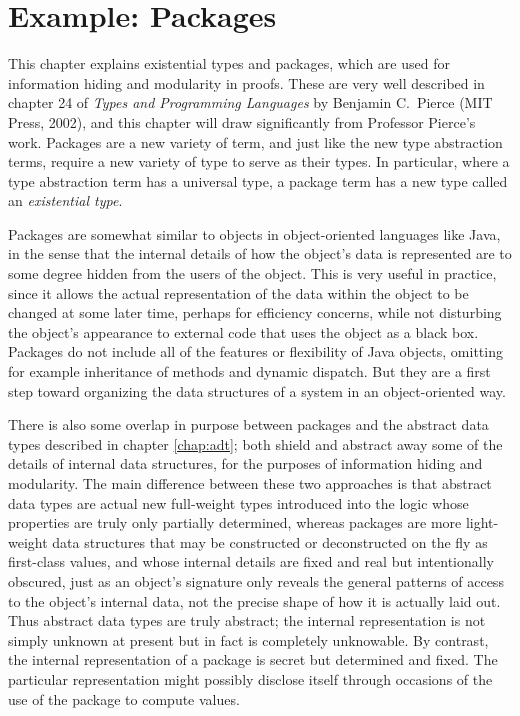 
\chapter{Example: Packages}\label{chap:package}

This chapter explains existential types and 
packages, which are used for information hiding and modularity in proofs. 
These are very well described in chapter 24 of {\it Types and Programming Languages\/} 
by Benjamin C.~Pierce (MIT Press, 2002), 
and this chapter will draw significantly from Professor Pierce's work.
Packages are a new variety of term, and
just like the new type abstraction terms, require a new
variety of type to serve as their types. In particular, 
where a type abstraction term has a universal type, 
a package term has a new type called an {\it existential type}.

Packages are somewhat similar to objects in 
object-oriented languages like Java, in the sense that the 
internal details of how the object's data is represented are
to some degree hidden from the users of the object.
This is very useful in practice, since it allows the actual
representation of the data within the object to be changed at
some later time, perhaps 
for efficiency concerns,
while not disturbing the 
object's appearance to 
external code that uses the object
as a black box.
Packages do not include all of the features or
flexibility of Java objects, omitting for example inheritance
of methods and dynamic dispatch. 
But they are a first step toward organizing
the data structures of a system in an object-oriented way.

There is also some overlap in purpose between packages
and the abstract data types described in chapter \ref{chap:adt};
both shield and abstract away some of the details of internal
data structures, for the purposes of information hiding and modularity.
The main difference between these two approaches
is that abstract data types are actual new
full-weight types introduced into the \HOLW{} logic 
whose properties are truly only partially determined, 
whereas packages are more
light-weight data structures that may be constructed or deconstructed
on the fly as first-class values, and whose internal details are fixed
and real but intentionally obscured, just as an object's signature only reveals
the general patterns of access to the object's internal data,
not the precise shape of how it is actually laid out.
Thus abstract data types are truly abstract; the internal
representation is not simply unknown at present but in fact
is completely unknowable. By contrast, the internal representation
of a package is secret but determined and fixed. 
The particular representation might possibly disclose itself 
through occasions of the use of the package to compute values.

